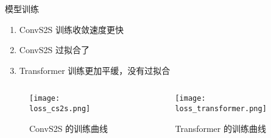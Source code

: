 \begin{frame}[c]{模型训练}
	\begin{enumerate}
		\item ConvS2S 训练收敛速度更快
		\item ConvS2S 过拟合了
		\item Transformer 训练更加平缓，没有过拟合
	\end{enumerate}
	\begin{columns}[t]
		\begin{column}[T]{5cm}
			\begin{figure}
				\centering
				\texttt{[image: loss\_cs2s.png]}
				\caption{{\scriptsize ConvS2S 的训练曲线}}
			\end{figure}
		\end{column}
		\begin{column}[T]{5cm}
			\begin{figure}
				\centering
				\texttt{[image: loss\_transformer.png]}
				\caption{{\scriptsize Transformer 的训练曲线}}
			\end{figure}
		\end{column}
	\end{columns}
\end{frame}

